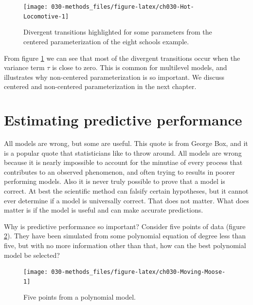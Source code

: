 \documentclass[11pt, oneside, openany]{scrbook}
\begin{document}
\begin{figure}

{\centering \texttt{[image: 030-methods\_files/figure-latex/ch030-Hot-Locomotive-1]} 

}

\caption{Divergent transitions highlighted for some parameters from the centered parameterization of the eight schools example.}\label{fig:ch030-Hot-Locomotive}
\end{figure}

From figure \ref{fig:ch030-Hot-Locomotive} we can see that most of the divergent transitions occur when the variance term \(\tau\) is close to zero. This is common for multilevel models, and illustrates why non-centered parameterization is so important. We discuss centered and non-centered parameterization in the next chapter.

\hypertarget{estimating-predictive-performance}{%
\section{Estimating predictive performance}\label{estimating-predictive-performance}}

All models are wrong, but some are useful. This quote is from George Box, and it is a popular quote that statisticians like to throw around. All models are wrong because it is nearly impossible to account for the minutiae of every process that contributes to an observed phenomenon, and often trying to results in poorer performing models. Also it is never truly possible to prove that a model is correct. At best the scientific method can falsify certain hypotheses, but it cannot ever determine if a model is universally correct. That does not matter. What does matter is if the model is useful and can make accurate predictions.

Why is predictive performance so important? Consider five points of data (figure \ref{fig:ch030-Moving-Moose}). They have been simulated from some polynomial equation of degree less than five, but with no more information other than that, how can the best polynomial model be selected?

\begin{figure}

{\centering \texttt{[image: 030-methods\_files/figure-latex/ch030-Moving-Moose-1]} 

}

\caption{Five points from a polynomial model.}\label{fig:ch030-Moving-Moose}
\end{figure}
\end{document}
